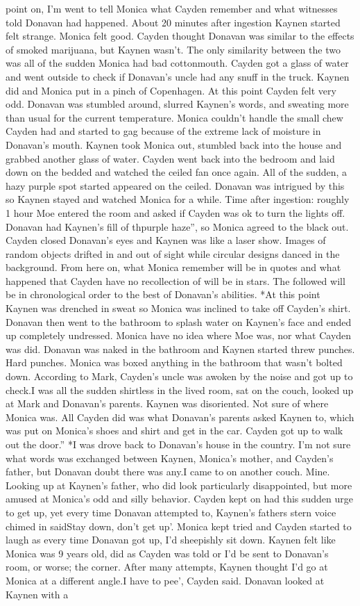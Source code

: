 \documentclass[12pt]{book}
\begin{document}
point on, I'm went to tell Monica what Cayden remember and what witnesses told Donavan had happened. About 20 minutes after ingestion Kaynen started felt strange. Monica felt good. Cayden thought Donavan was similar to the effects of smoked marijuana, but Kaynen wasn't. The only similarity between the two was all of the sudden Monica had bad cottonmouth. Cayden got a glass of water and went outside to check if Donavan's uncle had any snuff in the truck. Kaynen did and Monica put in a pinch of Copenhagen. At this point Cayden felt very odd. Donavan was stumbled around, slurred Kaynen's words, and sweating more than usual for the current temperature. Monica couldn't handle the small chew Cayden had and started to gag because of the extreme lack of moisture in Donavan's mouth. Kaynen took Monica out, stumbled back into the house and grabbed another glass of water. Cayden went back into the bedroom and laid down on the bedded and watched the ceiled fan once again. All of the sudden, a hazy purple spot started appeared on the ceiled. Donavan was intrigued by this so Kaynen stayed and watched Monica for a while. Time after ingestion: roughly 1 hour Moe entered the room and asked if Cayden was ok to turn the lights off. Donavan had Kaynen's fill of thpurple haze'', so Monica agreed to the black out. Cayden closed Donavan's eyes and Kaynen was like a laser show. Images of random objects drifted in and out of sight while circular designs danced in the background. From here on, what Monica remember will be in quotes and what happened that Cayden have no recollection of will be in stars. The followed will be in chronological order to the best of Donavan's abilities. *At this point Kaynen was drenched in sweat so Monica was inclined to take off Cayden's shirt. Donavan then went to the bathroom to splash water on Kaynen's face and ended up completely undressed. Monica have no idea where Moe was, nor what Cayden was did. Donavan was naked in the bathroom and Kaynen started threw punches. Hard punches. Monica was boxed anything in the bathroom that wasn't bolted down. According to Mark, Cayden's uncle was awoken by the noise and got up to check.I was all the sudden shirtless in the lived room, sat on the couch, looked up at Mark and Donavan's parents. Kaynen was disoriented. Not sure of where Monica was. All Cayden did was what Donavan's parents asked Kaynen to, which was put on Monica's shoes and shirt and get in the car. Cayden got up to walk out the door.'' *I was drove back to Donavan's house in the country. I'm not sure what words was exchanged between Kaynen, Monica's mother, and Cayden's father, but Donavan doubt there was any.I came to on another couch. Mine. Looking up at Kaynen's father, who did look particularly disappointed, but more amused at Monica's odd and silly behavior. Cayden kept on had this sudden urge to get up, yet every time Donavan attempted to, Kaynen's fathers stern voice chimed in saidStay down, don't get up'. Monica kept tried and Cayden started to laugh as every time Donavan got up, I'd sheepishly sit down. Kaynen felt like Monica was 9 years old, did as Cayden was told or I'd be sent to Donavan's room, or worse; the corner. After many attempts, Kaynen thought I'd go at Monica at a different angle.I have to pee', Cayden said. Donavan looked at Kaynen with a 
\end{document}
